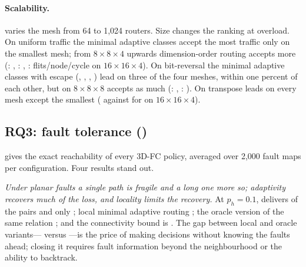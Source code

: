 \paragraph{Scalability.}  varies the mesh from 64 to 1,024 routers. Size changes the ranking at overload. On uniform traffic the minimal adaptive classes accept the most traffic only on the smallest mesh; from $8\times8\times4$ upwards dimension-order routing accepts more (: , : , :  flits/node/cycle on $16\times16\times4$). On bit-reversal the minimal adaptive classes with escape (, , , ) lead on three of the four meshes, within one percent of each other, but on $8\times8\times8$  accepts as much (: , : ). On transpose  leads on every mesh except the smallest ( against  for  on $16\times16\times4$).

\begin{table}[tbp]
\centering
\caption{Scalability: accepted throughput at overload (offered 0.6 flits/node/cycle; flits/node/cycle) for four mesh sizes, two seeds.}
\label{tab:scal}
\scriptsize
\setlength{\tabcolsep}{3.5pt}

\end{table}

\subsection{RQ3: fault tolerance ()}
\label{sec:rq-fault}

 gives the exact reachability of every 3D-FC policy, averaged over 2,000 fault maps per configuration. Four results stand out.

\emph{Under planar faults a single path is fragile and a long one more so; adaptivity recovers much of the loss, and locality limits the recovery.} At $p_h=0.1$,  delivers  of the pairs and  only ; local minimal adaptive routing ; the oracle version of the same relation ; and the connectivity bound is . The gap between local and oracle variants--- versus ---is the price of making decisions without knowing the faults ahead; closing it requires fault information beyond the neighbourhood or the ability to backtrack.

